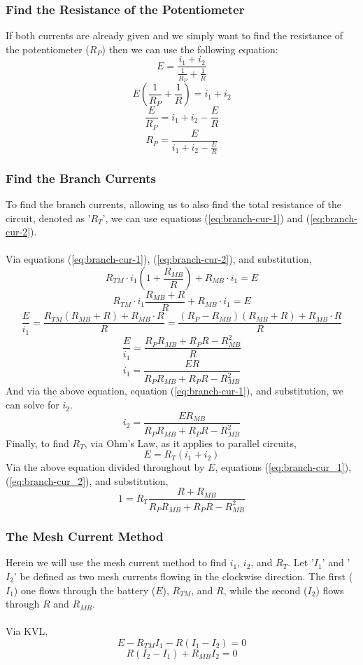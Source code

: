 \documentclass{article}
\begin{document}
	\subsubsection[ResistP]{Find the Resistance of the Potentiometer}
	If both currents are already given and we simply want to find the 
	resistance of the potentiometer ($R_P$) then we can use the following 
	equation:
	$$ E = \frac{i_1 + i_2}{\frac{1}{R_P} + \frac{1}{R}}$$
	$$ E \left(\frac{1}{R_P} + \frac{1}{R} \right) = i_1 + i_2$$
	$$\frac{E}{R_P} = i_1 + i_2 - \frac{E}{R} $$
	$$ R_P = \frac{E}{i_1 + i_2 - \frac{E}{R}}$$
	\subsubsection[Currents]{Find the Branch Currents}
	To find the branch currents, allowing us to also find the total 
	resistance of the circuit, denoted as '$R_T$', we can use equations 
	(\ref{eq:branch-cur-1}) and (\ref{eq:branch-cur-2}). \\ \\
	Via equations (\ref{eq:branch-cur-1}), (\ref{eq:branch-cur-2}), and 
	substitution,
	$$ R_{TM}\cdot i_1\left(1 + \frac{R_{MB}}{R}\right) + R_{MB}\cdot i_1=E$$
	$$ R_{TM} \cdot i_1 \frac{R_{MB} + R}{R} + R_{MB} \cdot i_1 = E$$
	$$ \frac{E}{i_1} = \frac{R_{TM}(R_{MB} + R) + R_{MB}\cdot R}{R} = 
	\frac{(R_P-R_{MB})(R_{MB} + R) + R_{MB}\cdot R}{R}$$
	$$ \frac{E}{i_1} = \frac{R_PR_{MB} + R_PR - R_{MB}^2}{R}$$
	\begin{equation}\label{eq:branch-cur_1}
		i_1 = \frac{ER}{R_PR_{MB} + R_PR - R_{MB}^2}
	\end{equation}
	And via the above equation, equation (\ref{eq:branch-cur-1}), and 
	substitution, we can solve for $i_2$.
	\begin{equation}\label{eq:branch-cur_2}
		i_2 = \frac{ER_{MB}}{R_PR_{MB} + R_PR - R_{MB}^2}
	\end{equation}
	Finally, to find $R_T$, via Ohm's Law, as it applies to parallel circuits,
	$$ E = R_T(i_1 + i_2)$$
	Via the above equation divided throughout by $E$, equations 
	(\ref{eq:branch-cur_1}), (\ref{eq:branch-cur_2}), and substitution,
	$$ 1 = R_T \frac{R + R_{MB}}{R_PR_{MB} + R_PR - R_{MB}^2}$$
	\subsubsection[Mesh]{The Mesh Current Method}
	Herein we will use the mesh current method to find $i_1$, $i_2$, and 
	$R_T$.  Let '$I_1$' and '$I_2$' be defined as two mesh currents flowing in 
	the clockwise direction.  The first ($I_1$) one flows through the battery 
	($E$), $R_{TM}$, and $R$, while the second ($I_2$) flows through $R$ and 
	$R_{MB}$. \\ \\
	Via KVL,
	\begin{equation}\label{eq:mesh-cur-1}
		E-R_{TM}I_1-R(I_1-I_2) = 0
	\end{equation}
	\begin{equation}\label{eq:mesh-cur-2}
		R(I_2-I_1)+R_{MB}I_2 = 0
	\end{equation}
\end{document}
